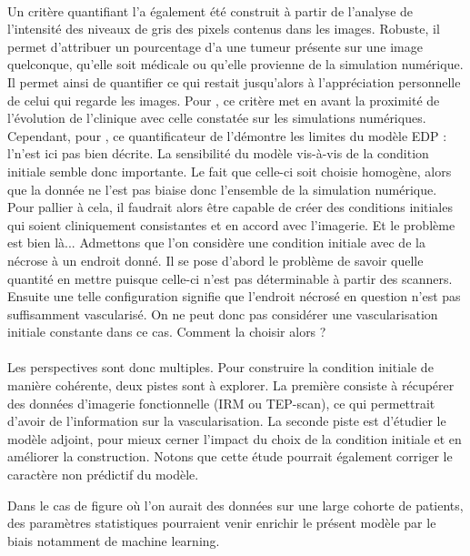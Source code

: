 \documentclass[main.tex]{subfiles}
\begin{document}
\paragraph{}
Un critère quantifiant l'\hetero a également été construit à partir de l'analyse de l'intensité des niveaux de gris des pixels contenus dans les images. Robuste, il permet d'attribuer un pourcentage d'\hetero a une tumeur présente sur une image quelconque, qu'elle soit médicale ou qu'elle provienne  de la simulation numérique. Il permet ainsi de quantifier ce qui restait jusqu'alors à l'appréciation personnelle de celui qui regarde les images. Pour \Nber, ce critère met en avant la proximité de l'évolution de l'\hetero clinique avec celle constatée sur les simulations numériques. Cependant, pour \Chen, ce quantificateur de l'\hetero démontre les limites du modèle EDP : l'\hetero n'est ici pas bien décrite. La sensibilité du modèle vis-à-vis de la condition initiale semble donc importante. Le fait que celle-ci soit choisie  homogène, alors que la donnée ne l'est pas biaise donc l'ensemble de la simulation numérique. Pour pallier à cela, il faudrait alors être capable de créer des conditions initiales qui soient cliniquement consistantes et en accord avec l'imagerie. Et le problème est bien là... Admettons que l'on considère une condition initiale avec de la nécrose à un endroit donné. Il se pose d'abord le problème de savoir quelle quantité en mettre puisque celle-ci n'est pas déterminable à partir des scanners. Ensuite une telle configuration  signifie que l'endroit nécrosé en question n'est pas suffisamment vascularisé. On ne peut donc pas considérer une vascularisation initiale constante dans ce cas. Comment la choisir alors ?


\paragraph{}
Les perspectives sont donc multiples. 
Pour construire la condition initiale de manière cohérente, deux pistes sont à explorer. La première consiste à récupérer des données d'imagerie fonctionnelle (IRM ou TEP-scan), ce qui permettrait d'avoir de l'information sur la vascularisation. La seconde piste est d'étudier le modèle adjoint, pour mieux cerner l'impact du choix de la condition initiale et en améliorer la construction.  
Notons que cette étude pourrait également corriger le caractère non prédictif du modèle. 

Dans le cas de figure où l'on aurait des données sur une large cohorte de patients, des paramètres statistiques pourraient venir enrichir le présent modèle par le biais notamment de machine learning.
\end{document}
